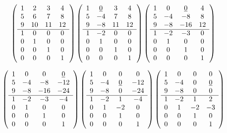 {\[
\left( \begin{array}{cccc}
1 &  2 &  3 &  4 \\
5 &  6 &  7 &  8 \\
9 & 10 & 11 & 12 \\ \cline{1-4}
1 &  0 &  0 &  0 \\
0 &  1 &  0 &  0 \\
0 &  0 &  1 &  0 \\
0 &  0 &  0 &  1
\end{array} \right)
\left( \begin{array}{cccc}
1 &  \underline{0} &  3 &  4 \\
5 & -4 &  7 &  8 \\
9 & -8 & 11 & 12 \\ \cline{1-4}
1 & -2 &  0 &  0 \\
0 &  1 &  0 &  0 \\
0 &  0 &  1 &  0 \\
0 &  0 &  0 &  1
\end{array} \right) 
\left( \begin{array}{cccc}
1 &  0 &   \underline{0} &  4 \\
5 & -4 &  -8 &  8 \\
9 & -8 & -16 & 12 \\ \cline{1-4}
1 & -2 &  -3 &  0 \\
0 &  1 &   0 &  0 \\
0 &  0 &   1 &  0 \\
0 &  0 &   0 &  1
\end{array} \right) \]

\[ \left( \begin{array}{cccc}
1 &  0 &   0 &   \underline{0} \\
5 & -4 &  -8 & -12 \\
9 & -8 & -16 & -24 \\ \cline{1-4}
1 & -2 &  -3 &  -4 \\
0 &  1 &   0 &   0 \\
0 &  0 &   1 &   0 \\
0 &  0 &   0 &   1
\end{array} \right) 
\left( \begin{array}{cccc}
1 &  0 &  0 &   0 \\
5 & -4 &  \underline{0} & -12 \\
9 & -8 &  0 & -24 \\ \cline{1-4}
1 & -2 &  1 &  -4 \\
0 &  1 & -2 &   0 \\
0 &  0 &  1 &   0 \\
0 &  0 &  0 &   1
\end{array} \right) 
\left( \begin{array}{cccc}
1 &  0 &  0 &  0 \\
5 & -4 &  0 &  \underline{0} \\
9 & -8 &  0 &  0 \\ \cline{1-4}
1 & -2 &  1 &  2 \\
0 &  1 & -2 & -3 \\
0 &  0 &  1 &  0 \\
0 &  0 &  0 &  1
\end{array} \right) \]

}
